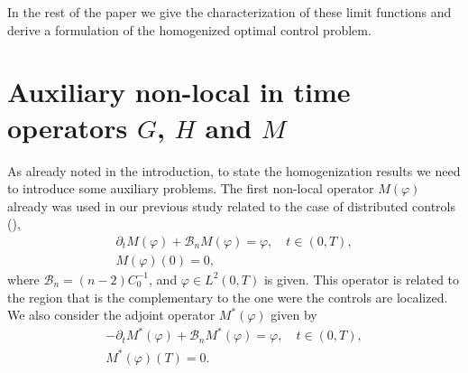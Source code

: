 \documentclass[reqno]{amsart}
\begin{document}
In the rest of the paper we  give the characterization of these limit
functions and derive a formulation of the homogenized optimal control
problem.

\section{Auxiliary non-local in time operators $G$, $H$ and $M$}\label{sec:aux}

As already  noted in the introduction, to state the homogenization
results we need to introduce some auxiliary problems. The first non-local
operator $M(\varphi )$ already was used in our previous study related to the
case of distributed controls (\cite{DiPoShAttouch}),
\begin{equation}
\begin{gathered}
\partial _{t}M(\varphi )+\mathcal{B}_nM(\varphi )=\varphi , \quad t\in (0,T),\\
M(\varphi )(0)=0, 
\end{gathered}  \label{tilde M prob}
\end{equation}
where $\mathcal{B}_n=(n-2)C_0^{-1}$, and $\varphi \in L^2(0,T)$ is
given. This operator is related to the region that is the complementary to
the one were the controls are localized. We also consider the adjoint
operator $M^{\ast }(\varphi )$ given by%
\begin{equation}
\begin{gathered}
-\partial _{t}M^{\ast }(\varphi )+\mathcal{B}_nM^{\ast }(\varphi )=\varphi, \quad
  t\in (0,T), \\
M^{\ast }(\varphi )(T)=0. 
\end{gathered}  \label{adj tilde M prob}
\end{equation}
\end{document}

